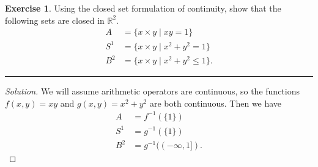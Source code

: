 \documentclass{article}
\theoremstyle{definition}
\newtheorem{exercise}{Exercise}[section]
\begin{document}
\pagebreak

\begin{exercise}
  Using the closed set formulation of continuity, show that the following sets are closed in $\mathbb{R}^2$.
  \begin{align*}
    A &= \{x\times y\mid xy = 1\} \\
    S^1 &= \{x\times y\mid x^2 + y^2 = 1\} \\
    B^2 &= \{x\times y\mid x^2 + y^2 \le 1\}.
  \end{align*}
\end{exercise}
\hrule
\begin{proof}[Solution]
  We will assume arithmetic operators are continuous, so the functions $f(x,y) = xy$ and $g(x,y) = x^2 + y^2$ are both continuous. Then we have
  \begin{align*}
    A &= f^{-1}(\{1\}) \\
    S^1 &= g^{-1}(\{1\}) \\
    B^2 &= g^{-1}((-\infty,1]).
  \end{align*}
\end{proof}

\pagebreak
\end{document}
